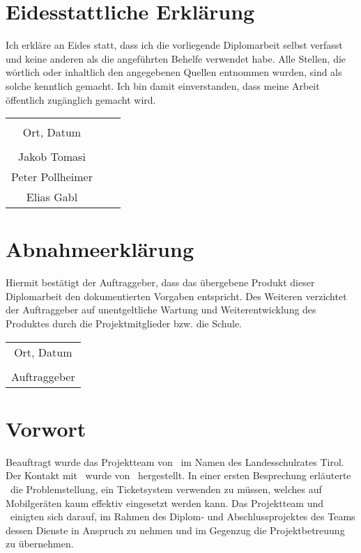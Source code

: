\chapter*{Eidesstattliche Erklärung}
Ich erkläre an Eides statt, dass ich die vorliegende Diplomarbeit selbst verfasst und keine anderen als die angeführten Behelfe verwendet habe. Alle Stellen, die wörtlich oder inhaltlich den angegebenen Quellen entnommen wurden, sind als solche kenntlich gemacht.
Ich bin damit einverstanden, dass meine Arbeit öffentlich zugänglich gemacht wird.

\vspace{1cm}
\begin{tabular}{c c c}
	& \hspace{4cm} & \\\cline{1-1}
	Ort, Datum & & \\
	\vspace{2cm}
	& & \\\cline{1-1}
	Jakob Tomasi
	\vspace{2cm}
	& & \\\cline{1-1}
	Peter Pollheimer
	\vspace{2cm}
	& & \\\cline{1-1}
	Elias Gabl 
\end{tabular}

\chapter*{Abnahmeerklärung}
Hiermit bestätigt der Auftraggeber, dass das übergebene Produkt dieser Diplomarbeit den dokumentierten Vorgaben entspricht. Des Weiteren verzichtet der Auftraggeber auf unentgeltliche Wartung und Weiterentwicklung des Produktes durch die Projektmitglieder bzw. die Schule.

\vspace{1cm}
\begin{tabular}{c}
	\\\cline{1-1}
	Ort, Datum\\
	\vspace{2cm}
	\\\cline{1-1}
	Auftraggeber
\end{tabular}	


\chapter*{Vorwort}
Beauftragt wurde das Projektteam von \getHammerl\ im Namen des Landesschulrates Tirol. Der Kontakt mit \getHammerl\ wurde von \getAlex\ hergestellt. In einer ersten Besprechung erläuterte \getHammerl\ die Problemstellung, ein Ticketsystem verwenden zu müssen, welches auf Mobilgeräten kaum effektiv eingesetzt werden kann. Das Projektteam und \getHammerl\ einigten sich darauf, im Rahmen des Diplom- und Abschlussprojektes des Teams dessen Dienste in Anspruch zu nehmen und im Gegenzug die Projektbetreuung zu übernehmen.



